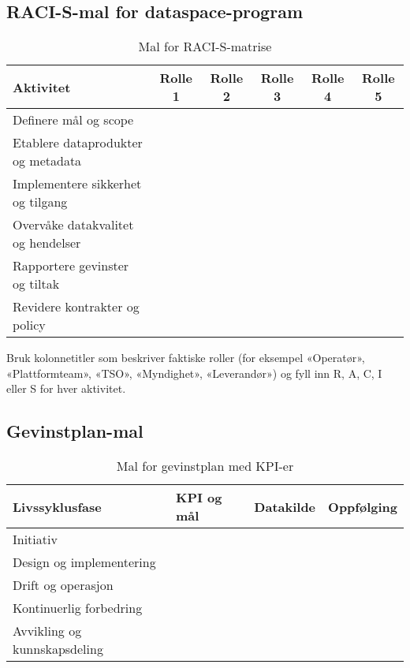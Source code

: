 \subsection{RACI-S-mal for dataspace-program}
\begin{table}[h]
    \centering
    \caption{Mal for RACI-S-matrise}
    \label{tab:appendix-raci}
    \begin{tabular}{p{4.2cm}ccccc}
        \toprule
        Aktivitet & Rolle 1 & Rolle 2 & Rolle 3 & Rolle 4 & Rolle 5 \\
        \midrule
        Definere mål og scope & & & & & \\
        Etablere dataprodukter og metadata & & & & & \\
        Implementere sikkerhet og tilgang & & & & & \\
        Overvåke datakvalitet og hendelser & & & & & \\
        Rapportere gevinster og tiltak & & & & & \\
        Revidere kontrakter og policy & & & & & \\
        \bottomrule
    \end{tabular}
\end{table}

Bruk kolonnetitler som beskriver faktiske roller (for eksempel «Operatør», «Plattformteam», «TSO», «Myndighet», «Leverandør») og fyll inn R, A, C, I eller S for hver aktivitet.

\subsection{Gevinstplan-mal}
\begin{table}[h]
    \centering
    \caption{Mal for gevinstplan med KPI-er}
    \label{tab:appendix-gevinstplan}
    \begin{tabular}{p{2.8cm}p{3.8cm}p{3.5cm}p{3.2cm}}
        \toprule
        Livssyklusfase & KPI og mål & Datakilde & Oppfølging \\
        \midrule
        Initiativ &  &  &  \\
        Design og implementering &  &  &  \\
        Drift og operasjon &  &  &  \\
        Kontinuerlig forbedring &  &  &  \\
        Avvikling og kunnskapsdeling &  &  &  \\
        \bottomrule
    \end{tabular}
\end{table}

